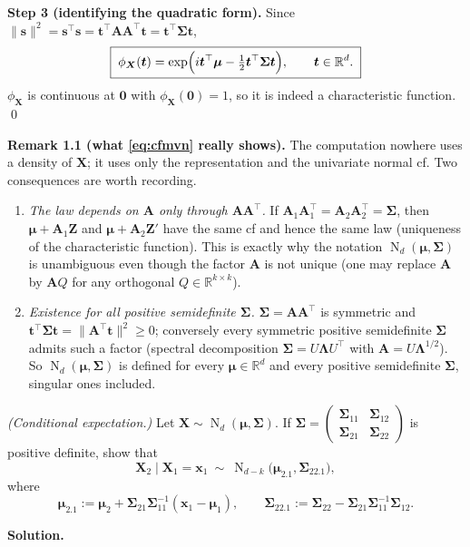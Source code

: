 \documentclass{MFM-hw} %
\newcommand{\real}{\mathbb{R}}
\newcommand{\normal}{\operatorname{N}}
\newcommand{\bX}{\bm{X}}
\newcommand{\bZ}{\bm{Z}}
\newcommand{\bA}{\bm{A}}
\newcommand{\bx}{\bm{x}}
\newcommand{\bs}{\bm{s}}
\newcommand{\bt}{\bm{t}}
\newcommand{\bmu}{\bm{\mu}}
\newcommand{\bSigma}{\bm{\Sigma}}
\newcommand{\bLambda}{\bm{\Lambda}}
\newcommand{\bzero}{\bm{0}}
\begin{document}
\noindent\textbf{Step 3 (identifying the quadratic form).} Since $\|\bs\|^2=\bs^\top\bs=\bt^\top\bA\bA^\top\bt=\bt^\top\bSigma\bt$,
\begin{equation}\label{eq:cfmvn}
    \boxed{\;\phi_{\bX}(\bt)=\exp\Bigl(i\bt^\top\bmu-\tfrac12\bt^\top\bSigma\bt\Bigr),\qquad \bt\in\real^d.\;}
\end{equation}
$\phi_{\bX}$ is continuous at $\bzero$ with $\phi_{\bX}(\bzero)=1$, so it is indeed a characteristic function. \qed

\smallskip
\noindent\textbf{Remark 1.1 (what \eqref{eq:cfmvn} really shows).} The computation nowhere uses a density of $\bX$; it uses only the representation and the univariate normal cf. Two consequences are worth recording.
\begin{enumerate}
    \item \emph{The law depends on $\bA$ only through $\bA\bA^\top$.} If $\bA_1\bA_1^\top=\bA_2\bA_2^\top=\bSigma$, then $\bmu+\bA_1\bZ$ and $\bmu+\bA_2\bZ'$ have the same cf and hence the same law (uniqueness of the characteristic function). This is exactly why the notation $\normal_d(\bmu,\bSigma)$ is unambiguous even though the factor $\bA$ is not unique (one may replace $\bA$ by $\bA Q$ for any orthogonal $Q\in\real^{k\times k}$).
    \item \emph{Existence for all positive semidefinite $\bSigma$.} $\bSigma=\bA\bA^\top$ is symmetric and $\bt^\top\bSigma\bt=\|\bA^\top\bt\|^2\ge0$; conversely every symmetric positive semidefinite $\bSigma$ admits such a factor (spectral decomposition $\bSigma=U\bLambda U^\top$ with $\bA=U\bLambda^{1/2}$). So $\normal_d(\bmu,\bSigma)$ is defined for every $\bmu\in\real^d$ and every positive semidefinite $\bSigma$, singular ones included.
\end{enumerate}

\HWproblem
\noindent\textit{(Conditional expectation.)} Let $\bX\sim\normal_d(\bmu,\bSigma)$. If
$\bSigma=\begin{pmatrix}\bSigma_{11}&\bSigma_{12}\\ \bSigma_{21}&\bSigma_{22}\end{pmatrix}$
is positive definite, show that
\[
    \bX_2\mid \bX_1=\bx_1\ \sim\ \normal_{d-k}\bigl(\bmu_{2.1},\bSigma_{22.1}\bigr),
\]
where
\[
    \bmu_{2.1}:=\bmu_2+\bSigma_{21}\bSigma_{11}^{-1}(\bx_1-\bmu_1),\qquad
    \bSigma_{22.1}:=\bSigma_{22}-\bSigma_{21}\bSigma_{11}^{-1}\bSigma_{12}.
\]

\medskip
\noindent\textbf{Solution.}
\end{document}
